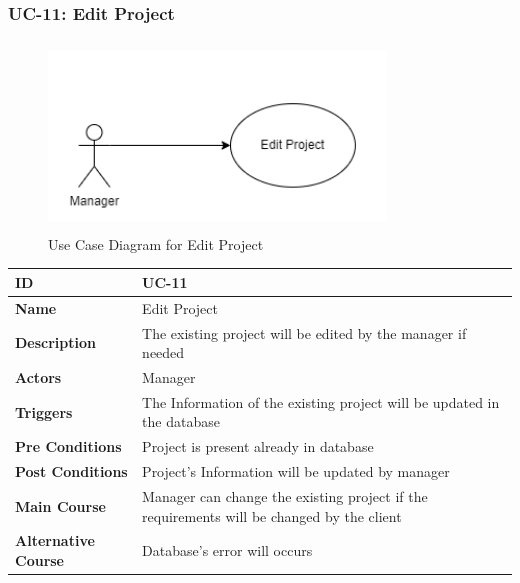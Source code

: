     \newpage

    \subsubsection{UC-11: Edit Project}
    \begin{figure}[H]
        \includegraphics[height=5cm, width=0.8\textwidth]{./diagrams/Use Case/u11.png}
        \centering 
        \caption{Use Case Diagram for Edit Project}
        \label{fig:Usecase1}
        \end{figure}
        
    \begin{center}
        \begin{tabularx}{\textwidth}{|l|X|}
            \hline
            \textbf{ID} & UC-11 \\
            \hline
            \textbf{Name} & Edit Project \\
            \hline
            \textbf{Description} & The existing project will be edited by the manager if needed  \\
            \hline
            \textbf{Actors} & Manager \\
            \hline
           \textbf{Triggers} & The Information of the existing project will be updated in the database \\
            \hline
            \textbf{Pre Conditions} & Project is present already in database \\
            \hline
            \textbf{Post Conditions} & Project's Information will be updated by manager \\
            \hline
            \textbf{Main Course} & Manager can change the existing project if the requirements will be changed by the client \\
            \hline
            \textbf{Alternative Course} & Database's error will occurs \\
            \hline
            
        \end{tabularx}
    \end{center}
    \newpage
    

